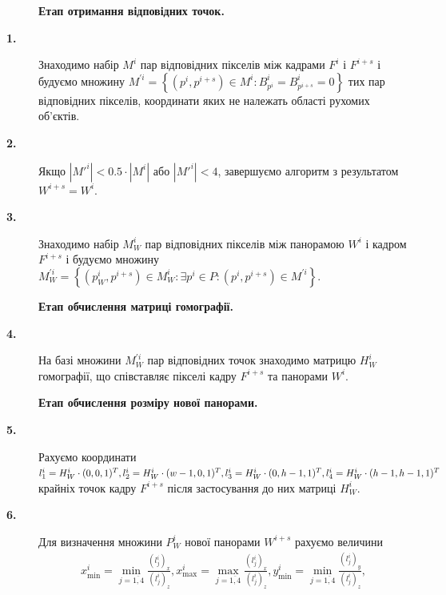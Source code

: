 \begin{description}
    \item[] \textbf{Етап отримання відповідних точок.}
    \item[\textbf{1.}]
        Знаходимо набір \(M^{i}\) пар відповідних пікселів між кадрами
        \(F^{i}\) і \(F^{i + s}\) і будуємо множину
        \(M^{'i} = \left\{ \left( p^{i},p^{i + s} \right) \in M^{i}:B_{p^{i}}^{i} = B_{p^{i + s}}^{i} = 0 \right\}\)
        тих пар відповідних пікселів, координати яких не належать області
        рухомих об'єктів.
    \item[\textbf{2.}]
        Якщо \(\left| {M'}^{i} \right| < 0.5 \cdot \left| M^{i} \right|\) або
        \(\left| {M'}^{i} \right| < 4\), завершуємо алгоритм з результатом
        \(W^{i + s} = W^{i}\).
    \item[\textbf{3.}]
        Знаходимо набір \(M_{W}^{i}\) пар відповідних пікселів між панорамою
        \(W^{i}\) і кадром \(F^{i + s}\) і будуємо множину
        \(M_{W}^{'i} = \left\{ \left( p_{W}^{i},p^{i + s} \right) \in M_{W}^{i}:\exists p^{i} \in P:\left( p^{i},p^{i + s} \right) \in M^{'i} \right\}\).
    \item[] \textbf{Етап обчислення матриці гомографії.}
    \item[\textbf{4.}]
        На базі множини \(M_{W}^{'i}\) пар відповідних точок знаходимо матрицю
        \(H_{W}^{i}\) гомографії, що співставляє пікселі кадру \(F^{i + s}\)
        та панорами \(W^{i}\).
    \item[] \textbf{Етап обчислення розміру нової панорами.}
    \item[\textbf{5.}]
        Рахуємо координати
        $
            l_{1}^{i} = H_{W}^{i} \cdot (0,0,1)^{T},
            l_{2}^{i} = H_{W}^{i} \cdot (w - 1,0,1)^{T}, \\
            l_{3}^{i} = H_{W}^{i} \cdot (0,h - 1,1)^{T},
            l_{4}^{i} = H_{W}^{i} \cdot (h - 1,h - 1,1)^{T}
        $
        крайніх точок кадру \(F^{i + s}\) після застосування до них матриці
        \(H_{W}^{i}\).
    \item[\textbf{6.}]
        Для визначення множини \(P_{W}^{i}\) нової панорами \(W^{i + s}\)
        рахуємо величини
        \begin{multline*}
            x_{\min}^{i} = \min_{j = \overline{1,4}}\frac{( l_{j}^{i} )_{x}}{( l_{j}^{i} )_{z}},
            x_{\max}^{i} = \max_{j = \overline{1,4}}\frac{( l_{j}^{i} )_{x}}{( l_{j}^{i} )_{z}},
            y_{\min}^{i} = \min_{j = \overline{1,4}}\frac{( l_{j}^{i} )_{y}}{( l_{j}^{i} )_{z}},

\end{multline*}
\end{description}
